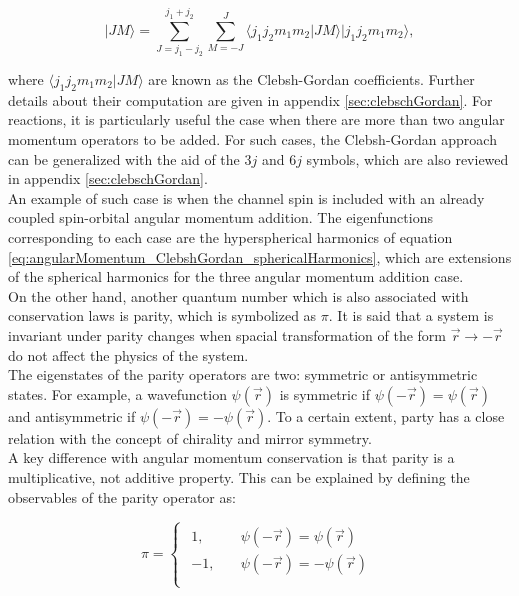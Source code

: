 \documentclass[openany]{book}
\begin{document}
\begin{equation} \label{eq:angularMomentum_coupledBaseExpansion}
 |JM \rangle = \sum_{J = j_1 - j_2}^{j_1 + j_2} \sum_{M = -J}^{J} {\langle j_1j_2m_1m_2 | JM \rangle  |j_1j_2m_1m_2\rangle},
\end{equation}

where $\langle j_1j_2m_1m_2 | JM \rangle $ are known as the Clebsh-Gordan coefficients. Further details about their computation are given in appendix \ref{sec:clebschGordan}. For reactions, it is particularly useful the case when there are more than two angular momentum operators to be added. For such cases, the Clebsh-Gordan approach can be generalized with the aid of the $3j$ and $6j$ symbols, which are also reviewed in appendix \ref{sec:clebschGordan}. \\

An example of such case is when the channel spin is included with an already coupled spin-orbital angular momentum addition. The eigenfunctions corresponding to each case are the hyperspherical harmonics of equation \ref{eq:angularMomentum_ClebshGordan_sphericalHarmonics}, which are extensions of the spherical harmonics for the three angular momentum addition case. \\

On the other hand, another quantum number which is also associated with conservation laws is parity, which is symbolized as $\pi$. It is said that a system is invariant under parity changes when spacial transformation of the form $\vec r \rightarrow - \vec r$ do not affect the physics of the system. \\

The eigenstates of the parity operators are two: symmetric  or antisymmetric states. For example, a wavefunction $\psi(\vec r)$ is symmetric if $\psi(-\vec r) = \psi(\vec r) $ and antisymmetric if $\psi(-\vec r) = -\psi(\vec r) $. To a certain extent, party has a close relation with the concept of chirality and mirror symmetry. \\

A key difference with angular momentum conservation is that parity is a multiplicative, not additive property. This can be explained by defining the observables of the parity operator as:  

\begin{equation} \label{eq:parity_observables}
	\pi = 	\left\{\begin{array}{l}
		\begin{split}
			1, \quad & \psi(-\vec r) = \psi(\vec r) \\ 
			-1, \quad & \psi(-\vec r) = -\psi(\vec r) \\
		\end{split}
	\end{array}\right.
\end{equation}
\end{document}
